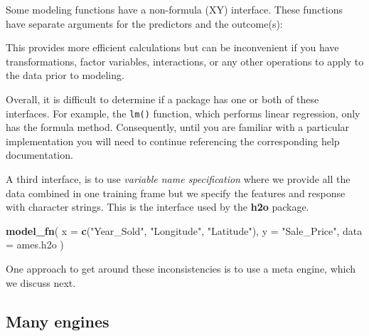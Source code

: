 \documentclass[]{krantz}
\makeatletter
\newenvironment{Shaded}{\begin{snugshade}}{\end{snugshade}}
\newcommand{\CommentTok}[1]{\textcolor[rgb]{0.37,0.37,0.37}{\textit{#1}}}
\newcommand{\DataTypeTok}[1]{\textcolor[rgb]{0.27,0.27,0.27}{#1}}
\newcommand{\KeywordTok}[1]{\textcolor[rgb]{0.27,0.27,0.27}{\textbf{#1}}}
\newcommand{\NormalTok}[1]{#1}
\newcommand{\OperatorTok}[1]{\textcolor[rgb]{0.43,0.43,0.43}{\textbf{#1}}}
\newcommand{\StringTok}[1]{\textcolor[rgb]{0.5,0.5,0.5}{#1}}
\newenvironment{kframe}{%
\medskip{}
\setlength{\fboxsep}{.8em}
 \def\at@end@of@kframe{}%
 \ifinner\ifhmode%
  \def\at@end@of@kframe{\end{minipage}}%
  \begin{minipage}{\columnwidth}%
 \fi\fi%
 \def\FrameCommand##1{\hskip\@totalleftmargin \hskip-\fboxsep
 \colorbox{shadecolor}{##1}\hskip-\fboxsep
     \hskip-\linewidth \hskip-\@totalleftmargin \hskip\columnwidth}%
 \MakeFramed {\advance\hsize-\width
   \@totalleftmargin\z@ \linewidth\hsize
   \@setminipage}}%
 {\par\unskip\endMakeFramed%
 \at@end@of@kframe}
\renewenvironment{Shaded}{\begin{kframe}}{\end{kframe}}
\makeatother
\begin{document}
Some modeling functions have a non-formula (XY) interface. These functions have separate arguments for the predictors and the outcome(s):

\begin{Shaded}
\end{Shaded}

This provides more efficient calculations but can be inconvenient if you have transformations, factor variables, interactions, or any other operations to apply to the data prior to modeling.

Overall, it is difficult to determine if a package has one or both of these interfaces. For example, the \texttt{lm()} function, which performs linear regression, only has the formula method. Consequently, until you are familiar with a particular implementation you will need to continue referencing the corresponding help documentation.

A third interface, is to use \emph{variable name specification} where we provide all the data combined in one training frame but we specify the features and response with character strings. This is the interface used by the \textbf{h2o} package.

\begin{Shaded}
\begin{Highlighting}[]
\KeywordTok{model_fn}\NormalTok{(}
  \DataTypeTok{x =} \KeywordTok{c}\NormalTok{(}\StringTok{"Year_Sold"}\NormalTok{, }\StringTok{"Longitude"}\NormalTok{, }\StringTok{"Latitude"}\NormalTok{),}
  \DataTypeTok{y =} \StringTok{"Sale_Price"}\NormalTok{,}
  \DataTypeTok{data =}\NormalTok{ ames.h2o}
\NormalTok{  )}
\end{Highlighting}
\end{Shaded}

One approach to get around these inconsistencies is to use a meta engine, which we discuss next.

\hypertarget{many-engines}{%
\subsection{Many engines}\label{many-engines}}
\end{document}
